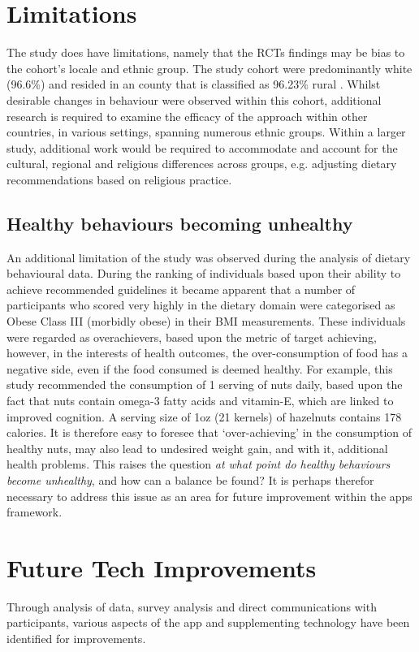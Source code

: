 \section{Limitations}
The study does have limitations, namely that the RCTs findings may be bias to the cohort’s locale and ethnic group. The study cohort were predominantly white (96.6\%) and resided in an county that is classified as 96.23\% rural \cite{UnitedStatesCensusBureau}. Whilst desirable changes in behaviour were observed within this cohort, additional research is required to examine the efficacy of the approach within other countries, in various settings, spanning numerous ethnic groups.
Within a larger study, additional work would be required to accommodate and account for the cultural, regional and religious differences across groups, e.g. adjusting dietary recommendations based on religious practice.

\subsection{Healthy behaviours becoming unhealthy}
An additional limitation of the study was observed during the analysis of dietary behavioural data.
During the ranking of individuals based upon their ability to achieve recommended guidelines it became apparent that a number of participants who scored very highly in the dietary domain were categorised as Obese Class III (morbidly obese) in their BMI measurements. These individuals were regarded as overachievers, based upon the metric of target achieving, however, in the interests of health outcomes, the over-consumption of food has a negative side, even if the food consumed is deemed healthy.
For example, this study recommended the consumption of 1 serving of nuts daily, based upon the fact that nuts contain omega-3 fatty acids and vitamin-E, which are linked to improved cognition. A serving size of 1oz (21 kernels) of hazelnuts contains 178 calories. It is therefore easy to foresee that `over-achieving' in the consumption of healthy nuts, may also lead to undesired weight gain, and with it, additional health problems.
This raises the question \textit{at what point do healthy behaviours become unhealthy}, and how can a balance be found?
\newline It is perhaps therefor necessary to address this issue as an area for future improvement within the apps framework.

\section{Future Tech Improvements} \label{section: future-improvements}
Through analysis of data, survey analysis and direct communications with participants, various aspects of the app and supplementing technology have been identified for improvements.

